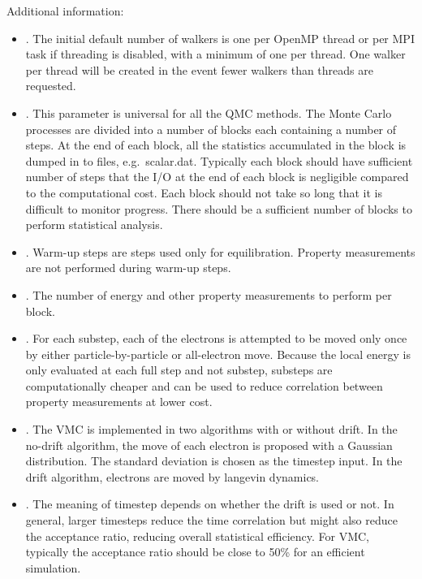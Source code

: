 Additional information:
\begin{itemize}
\item {}. The initial default number of walkers is one per OpenMP thread or per MPI task if threading is disabled, with a minimum of one per thread. One walker per thread will be created in the event fewer walkers than threads are requested. 

\item {}. This parameter is universal for all the QMC
  methods. The Monte Carlo processes are divided into a number of
  blocks each containing a number of steps. At the end of each block,
  all the statistics accumulated in the block is dumped in to files,
  e.g.\ scalar.dat. Typically each block should have sufficient number
  of steps that the I/O at the end of each block is negligible
  compared to the computational cost. Each block should not take so
  long that it is difficult to monitor progress. There should be a
  sufficient number of blocks to perform statistical analysis.

\item {}. Warm-up steps are steps used only for
  equilibration. Property measurements are not performed during
  warm-up steps.

\item {}. The number of energy and other property measurements to perform per block.
  
\item {}. For each substep, each of the electrons is
  attempted to be moved only once by either particle-by-particle or
  all-electron move.  Because the local energy is only evaluated at
  each full step and not substep, substeps are computationally cheaper
  and can be used to reduce correlation between property measurements
  at lower cost.
  
\item {}. The VMC is implemented in two algorithms with
  or without drift. In the no-drift algorithm, the move of each
  electron is proposed with a Gaussian distribution. The standard
  deviation is chosen as the timestep input. In the drift algorithm,
  electrons are moved by langevin dynamics.

\item {}. The meaning of timestep depends on whether
  the drift is used or not. In general, larger timesteps reduce the
  time correlation but might also reduce the acceptance ratio,
  reducing overall statistical efficiency. For VMC, typically the
  acceptance ratio should be close to 50\% for an efficient
  simulation.


\end{itemize}
